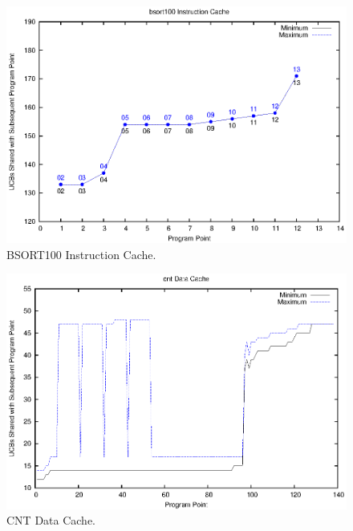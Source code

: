 \begin{figure}[h!]
\begin{center}
\includegraphics[width=\linewidth]{eps/bsort100-icache.eps}
\caption{BSORT100 Instruction Cache.}
\label{fig:bsort100_instruction_cache}
\end{center}
\end{figure}
%
\vspace{-20pt}
\begin{figure}[h!]
\begin{center}
\includegraphics[width=\linewidth]{eps/cnt-dcache.eps}
\caption{CNT Data Cache.}
\label{fig:cnt_data_cache}
\end{center}
\end{figure}
%
\vspace{-20pt}
